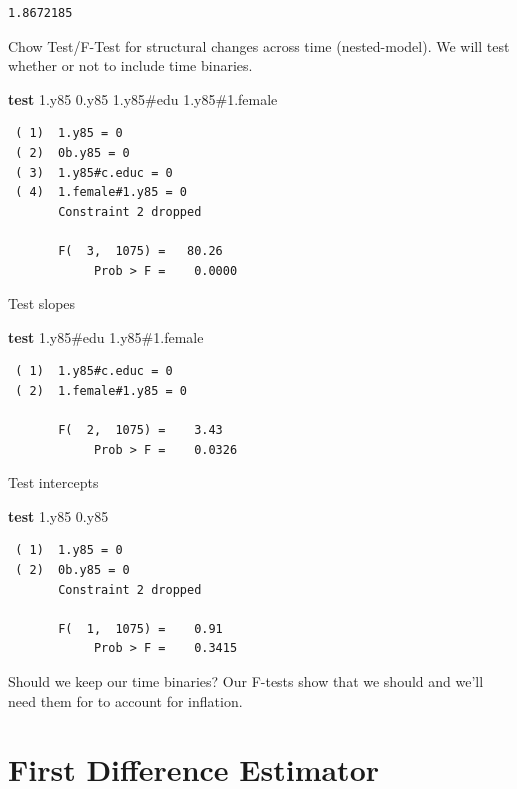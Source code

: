 \documentclass[
]{book}
\newenvironment{Shaded}{\begin{snugshade}}{\end{snugshade}}
\newcommand{\KeywordTok}[1]{\textcolor[rgb]{0.13,0.29,0.53}{\textbf{#1}}}
\newcommand{\NormalTok}[1]{#1}
\begin{document}
\begin{verbatim}
1.8672185
\end{verbatim}

Chow Test/F-Test for structural changes across time (nested-model). We will test whether or not to include time binaries.

\begin{Shaded}
\begin{Highlighting}[]
\KeywordTok{test}\NormalTok{ 1.y85 0.y85 1.y85\#edu 1.y85\#1.female}
\end{Highlighting}
\end{Shaded}

\begin{verbatim}
 ( 1)  1.y85 = 0
 ( 2)  0b.y85 = 0
 ( 3)  1.y85#c.educ = 0
 ( 4)  1.female#1.y85 = 0
       Constraint 2 dropped

       F(  3,  1075) =   80.26
            Prob > F =    0.0000
\end{verbatim}

Test slopes

\begin{Shaded}
\begin{Highlighting}[]
\KeywordTok{test}\NormalTok{ 1.y85\#edu 1.y85\#1.female}
\end{Highlighting}
\end{Shaded}

\begin{verbatim}
 ( 1)  1.y85#c.educ = 0
 ( 2)  1.female#1.y85 = 0

       F(  2,  1075) =    3.43
            Prob > F =    0.0326
\end{verbatim}

Test intercepts

\begin{Shaded}
\begin{Highlighting}[]
\KeywordTok{test}\NormalTok{ 1.y85 0.y85}
\end{Highlighting}
\end{Shaded}

\begin{verbatim}
 ( 1)  1.y85 = 0
 ( 2)  0b.y85 = 0
       Constraint 2 dropped

       F(  1,  1075) =    0.91
            Prob > F =    0.3415
\end{verbatim}

Should we keep our time binaries? Our F-tests show that we should and we'll need them for to account for inflation.

\section{First Difference Estimator}\label{first-difference-estimator}
\end{document}
